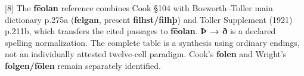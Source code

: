 [8] The \textbf{fēolan} reference combines Cook §104 with Bosworth–Toller main dictionary p.275a (\textbf{felgan}, present \textbf{filhst/\allowbreak{}filhþ}) and Toller Supplement (1921) p.211b, which transfers the cited passages to \textbf{fēolan}. \textbf{Þ → ð} is a declared spelling normalization. The complete table is a synthesis using ordinary endings, not an individually attested twelve-cell paradigm. Cook's \textbf{folen} and Wright's \textbf{folgen/\allowbreak{}fōlen} remain separately identified.

\endgroup


